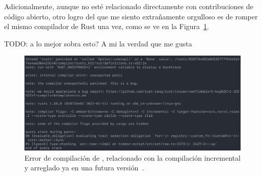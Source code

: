 Adicionalmente, aunque no esté relacionado directamente con contribuciones de
código abierto, otro logro del que me siento extrañamente orgulloso es de romper
el mismo compilador de Rust una vez, como se ve en la
Figura~\ref{fig:rustc_crash}.

TODO: a lo mejor sobra esto? A mi la verdad que me gusta

\begin{figure}
    \centering
    \includegraphics[width=\textwidth]{./Imagenes/rustc_crash.png}
    \caption{Error de compilación de , relacionado con la
    compilación incremental y arreglado ya en una futura
    versión~\cite{rustc_fix}.}%
    \label{fig:rustc_crash}
\end{figure}
